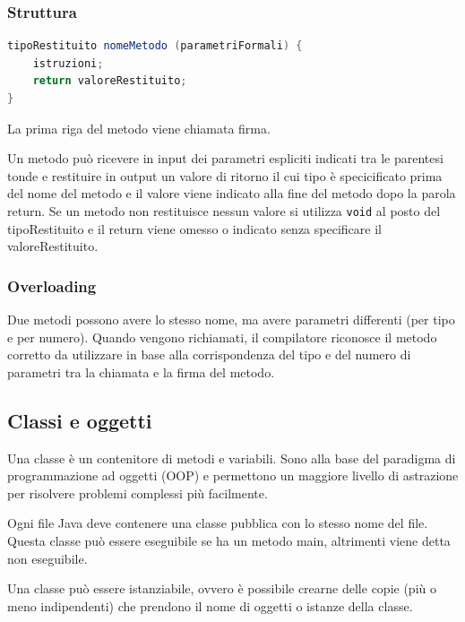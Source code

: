 \documentclass[a4paper]{article}
\begin{document}
\subsubsection*{Struttura}
\begin{lstlisting}[language=Java]
tipoRestituito nomeMetodo (parametriFormali) {
	istruzioni;
	return valoreRestituito;
}
\end{lstlisting}

La prima riga del metodo viene chiamata firma.

Un metodo può ricevere in input dei parametri espliciti indicati tra le parentesi tonde e restituire in output un valore di ritorno
il cui tipo è specicificato prima del nome del metodo e il valore viene indicato alla fine del metodo dopo la parola return.
Se un metodo non restituisce nessun valore si utilizza \verb|void| al posto del tipoRestituito e il return viene omesso o 
indicato senza specificare il valoreRestituito.

\subsubsection*{Overloading}
Due metodi possono avere lo stesso nome, ma avere parametri differenti (per tipo e per numero). Quando vengono richiamati, il
compilatore riconosce il metodo corretto da utilizzare in base alla corrispondenza del tipo e del numero di parametri tra la chiamata
e la firma del metodo.


\subsection{Classi e oggetti}
Una classe è un contenitore di metodi e variabili. Sono alla base del paradigma di programmazione ad oggetti (OOP) e permettono
un maggiore livello di astrazione per risolvere problemi complessi più facilmente.

Ogni file Java deve contenere una classe pubblica con lo stesso nome del file. Questa classe può essere eseguibile se ha un metodo
main, altrimenti viene detta non eseguibile.

Una classe può essere istanziabile, ovvero è possibile crearne delle copie (più o meno indipendenti) che prendono il nome di oggetti
o istanze della classe.
\end{document}
